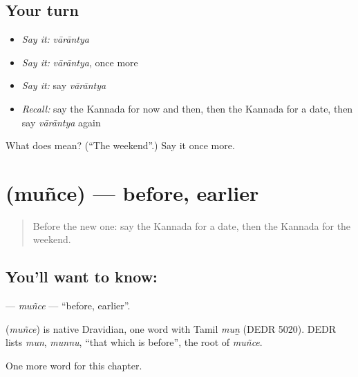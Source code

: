 \subsection*{Your turn}
\begin{itemize}
\raggedright
  \item \emph{Say it:} \emph{vārāntya}
  \item \emph{Say it:} \emph{vārāntya}, once more
  \item \emph{Say it:} say \emph{vārāntya}
  \item \emph{Recall:} say the Kannada for now and then, then the Kannada for a date, then say \emph{vārāntya} again
\end{itemize}

\begin{tcolorbox}[breakable,colback=teal!4,colframe=teal!35!black,title={Before you move on}]
What does  mean? (\textquotedblleft{}The weekend\textquotedblright{}.) Say it once more.
\end{tcolorbox}
\section[\texorpdfstring{\kn{ಮುಂಚೆ} (muñce)}{ಮುಂಚೆ (muñce)}]{ (muñce) — before, earlier}

\label{lesson:KA-C171-munce}



\begin{quote}
Before the new one: say the Kannada for a date, then the Kannada for the weekend.
\end{quote}

\subsection*{You'll want to know: }
\textbf{} — \emph{muñce} — \textquotedblleft{}before, earlier\textquotedblright{}.

\begin{cousinweb}
\textbf{} (\emph{muñce}) is native Dravidian, one word with Tamil \emph{muṉ} (DEDR 5020). DEDR lists \emph{mun}, \emph{munnu}, \textquotedblleft{}that which is before\textquotedblright{}, the root of \emph{muñce}.
\end{cousinweb}

\begin{grammarlens}[title={What you've built}]
One more word for this chapter.
\end{grammarlens}

